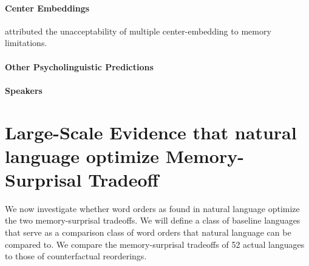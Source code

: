 \documentclass[11pt,letterpaper]{article}
\begin{document}
\paragraph{Center Embeddings}

\cite{miller-finitary-1963} attributed the unacceptability of multiple center-embedding to memory limitations.







\paragraph{Other Psycholinguistic Predictions}


\paragraph{Speakers}



\section{Large-Scale Evidence that natural language optimize Memory-Surprisal Tradeoff}

We now investigate whether word orders as found in natural language optimize the two memory-surprisal tradeoffs.
We will define a class of baseline languages that serve as a comparison class of word orders that natural language can be compared to.
We compare the memory-surprisal tradeoffs of 52 actual languages to those of counterfactual reorderings.
\end{document}
